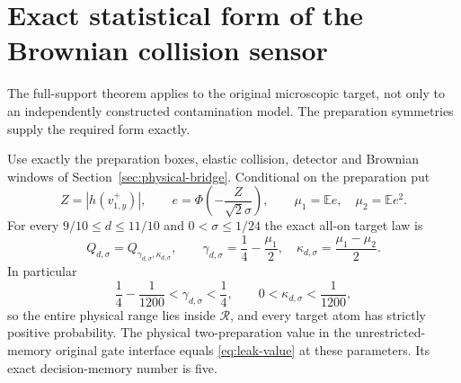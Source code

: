 \section{Exact statistical form of the Brownian collision sensor}
\label{sec:physical-noise-law}
The full-support theorem applies to the original microscopic target,
not only to an independently constructed contamination model. The
preparation symmetries supply the required form exactly.

\begin{theorem}
\label{thm:physical-noise-form}
Use exactly the preparation boxes, elastic collision, detector and
Brownian windows of Section~\ref{sec:physical-bridge}. Conditional on
the preparation put
\[
 Z=|h(v_{1,y}^{+})|,\qquad
 e=\Phi\left(-\frac{Z}{\sqrt2\sigma}\right),\qquad
 \mu_1=\mathbb E e,\quad \mu_2=\mathbb E e^2.
\]
For every $9/10\le d\le11/10$ and $0<\sigma\le1/24$ the exact
all-on target law is
\begin{equation}\label{eq:exact-physical-target}
 Q_{d,\sigma}=Q_{\gamma_{d,\sigma},\kappa_{d,\sigma}},\qquad
 \gamma_{d,\sigma}=\frac14-\frac{\mu_1}{2},\quad
 \kappa_{d,\sigma}=\frac{\mu_1-\mu_2}{2}.
\end{equation}
In particular
\[
 \frac14-\frac1{1200}<\gamma_{d,\sigma}<\frac14,
 \qquad0<\kappa_{d,\sigma}<\frac1{1200},
\]
so the entire physical range lies inside $\mathcal R$, and every target
atom has strictly positive probability. The physical two-preparation
value in the unrestricted-memory original gate interface equals
\eqref{eq:leak-value} at these parameters. Its exact decision-memory
number is five.
\end{theorem}
